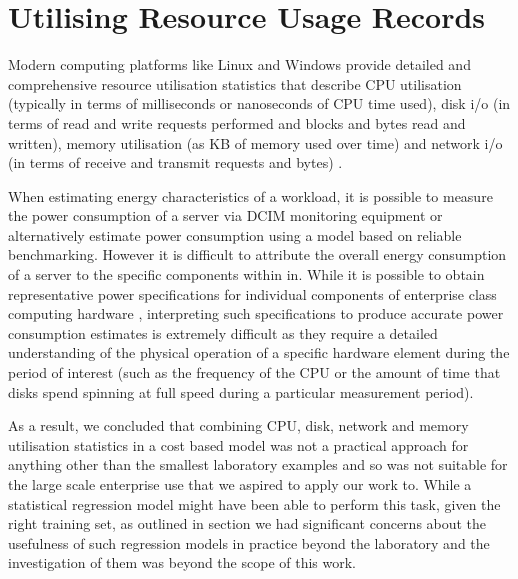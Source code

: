 \begin{itemize}
\end{itemize}

\section{Utilising Resource Usage Records} \label{sec:utilisingresourceusage}

Modern computing platforms like Linux and Windows provide detailed and comprehensive resource utilisation statistics that describe CPU utilisation (typically in terms of milliseconds or nanoseconds of CPU time used), disk i/o (in terms of read and write requests performed and blocks and bytes read and written), memory utilisation (as KB of memory used over time) and network i/o (in terms of receive and transmit requests and bytes) \cite{unix_sar_command, windows_performance_monitor}.

When estimating energy characteristics of a workload, it is possible to measure the power consumption of a server via DCIM monitoring equipment or alternatively estimate power consumption using a model based on reliable benchmarking.  However it is difficult to attribute the overall energy consumption of a server to the specific components within in.  While it is possible to obtain representative power specifications for individual components of enterprise class computing hardware \cite{hitachi_drive_data_sheet}, interpreting such specifications to produce accurate power consumption estimates is extremely difficult as they require a detailed understanding of the physical operation of a specific hardware element during the period of interest (such as the frequency of the CPU or the amount of time that disks spend spinning at full speed during a particular measurement period).

As a result, we concluded that combining CPU, disk, network and memory utilisation statistics in a cost based model was not a practical approach for anything other than the smallest laboratory examples and so was not suitable for the large scale enterprise use that we aspired to apply our work to.  While a statistical regression model might have been able to perform this task, given the right training set, as outlined in section  we had significant concerns about the usefulness of such regression models in practice beyond the laboratory and the investigation of them was beyond the scope of this work.


